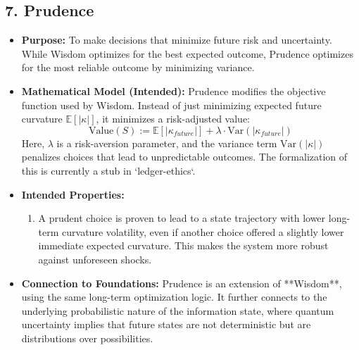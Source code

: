 \documentclass[11pt,a4paper]{article}
\begin{document}
\begin{itemize}
\subsection{7. Prudence}
\begin{itemize}
    \item \textbf{Purpose:} To make decisions that minimize future risk and uncertainty. While Wisdom optimizes for the best expected outcome, Prudence optimizes for the most reliable outcome by minimizing variance.
    \item \textbf{Mathematical Model (Intended):} Prudence modifies the objective function used by Wisdom. Instead of just minimizing expected future curvature $\mathbb{E}[|\kappa|]$, it minimizes a risk-adjusted value:
        \[ \text{Value}(S) := \mathbb{E}[|\kappa_{future}|] + \lambda \cdot \text{Var}(|\kappa_{future}|) \]
        Here, $\lambda$ is a risk-aversion parameter, and the variance term $\text{Var}(|\kappa|)$ penalizes choices that lead to unpredictable outcomes. The formalization of this is currently a stub in `ledger-ethics`.
    \item \textbf{Intended Properties:}
        \begin{enumerate}
            \item A prudent choice is proven to lead to a state trajectory with lower long-term curvature volatility, even if another choice offered a slightly lower immediate expected curvature. This makes the system more robust against unforeseen shocks.
        \end{enumerate}
    \item \textbf{Connection to Foundations:} Prudence is an extension of **Wisdom**, using the same long-term optimization logic. It further connects to the underlying probabilistic nature of the information state, where quantum uncertainty implies that future states are not deterministic but are distributions over possibilities.
\end{itemize}


\end{itemize}
\end{document}
